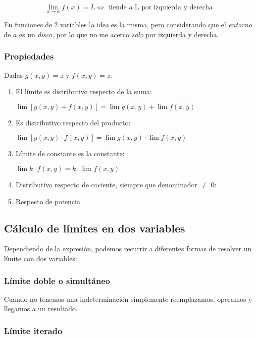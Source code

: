 \begin{equation*}
    \lim_{x\to a} f(x) = L \iff \text{ tiende a L por izquierda y derecha}
\end{equation*}

En funciones de 2 variables la idea es la misma, pero considerando que el 
\textit{entorno} de \(a\) es un \textit{disco}, por lo que no me acerco 
\textit{solo} por izquierda y derecha.

\subsubsection{Propiedades}

Dadas \(g(x,y) = z\) y \(f(x,y) = z\):

\begin{enumerate}
    \item El límite es distributivo respecto de la suma:
    
    \(\lim \left[g(x,y) + f(x,y)\right] = \lim g(x,y) + \lim f(x,y)\)
    \item Es distributivo respecto del producto:
    
    \(\lim \left[g(x,y) \cdot f(x,y)\right] = \lim g(x,y) \cdot \lim f(x,y)\)
    \item Límite de constante es la constante:
    
    \(\lim k\cdot f(x,y) = k\cdot\lim f(x,y)\)
    \item Distributivo respecto de cociente, siempre que denominador \(\neq\) 0:
    

    \item Respecto de potencia
\end{enumerate}


\subsection{Cálculo de límites en dos variables}

Dependiendo de la expresión, podemos recurrir a diferentes formas de resolver un 
límite con dos variables:

\subsubsection{Límite doble o simultáneo}

Cuando no tenemos una indeterminación simplemente reemplazamos, operamos y 
llegamos a un resultado.

\subsubsection{Límite iterado}

